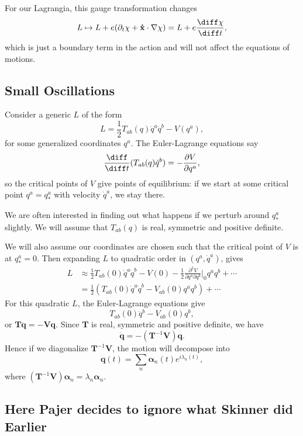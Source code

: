 \documentclass[12pt]{article}
\begin{document}
For our Lagrangia, this gauge transformation changes
\[
L \mapsto L + e(\partial_t \chi + \mathbf{\dot x} \cdot \nabla \chi) = L + e \frac{\diff \chi}{\diff t},
\]
which is just a boundary term in the action and will not affect the equations of motions.

\subsection{Small Oscillations}
\label{sub:small_oscs}

Consider a generic $L$ of the form
\[
L = \frac{1}{2} T_{ab}(q) \dot q^a \dot q^b - V(q^a),
\]
for some generalized coordinates $q^a$. The Euler-Lagrange equations say
\[
\frac{\diff}{\diff t} (T_{ab}(q) \dot q^b) = - \frac{\partial V}{\partial q^a},
\]
so the critical points of $V$ give points of equilibrium: if we start at some critical point $q^a = q^a_\ast$ with velocity $\dot q^a$, we stay there.

We are often interested in finding out what happens if we perturb around $q^a_\ast$ slightly. We will assume that $T_{ab}(q)$ is real, symmetric and positive definite.

We will also assume our coordinates are chosen such that the critical point of $V$ is at $q^a_\ast = 0$. Then expanding $L$ to quadratic order in $(q^a, \dot q^a)$, gives
\begin{align*}
	L &\approx \frac{1}{2} T_{ab}(0) \dot q^a \dot q^b - V(0) - \frac{1}{2} \frac{\partial^2 V}{\partial q^a \partial q^b} \biggr|_0 q^a q^b + \cdots \\
	  &= \frac{1}{2} (T_{ab}(0) \dot q^a \dot q^b - V_{ab}(0)q^a q^b) + \cdots
\end{align*}
For this quadratic $L$, the Euler-Lagrange equations give
\[
T_{ab}(0) \ddot q^b - V_{ab}(0) q^b,
\]
or $\mathbf{T} \mathbf{\ddot q} = - \mathbf{V} \mathbf{q}$. Since $\mathbf{T}$ is real, symmetric and positive definite, we have
\[
\mathbf{\ddot q} = - (\mathbf{T}^{-1} \mathbf{V})\mathbf{q}.
\]
Hence if we diagonalize $\mathbf{T}^{-1}\mathbf{V}$, the motion will decompose into
\[
	\mathbf{q}(t) = \sum_n \bm{\alpha}_n(t) e^{i \lambda_n(t)},
\]
where $(\mathbf{T}^{-1}\mathbf{V})\bm{\alpha}_n = \lambda_n \bm{\alpha}_n$.


\subsection{Here Pajer decides to ignore what Skinner did Earlier}
\end{document}

